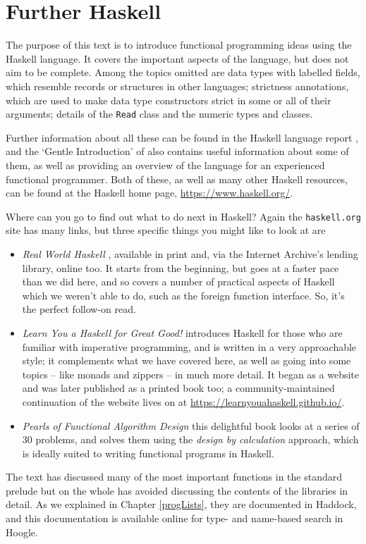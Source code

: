 \section*{Further Haskell}

The purpose of this text is to introduce functional programming ideas using the
Haskell language. It covers the important aspects of the language, but does not
aim to be complete. Among the topics omitted are data types with labelled fields, which resemble
records or structures in other languages; strictness annotations, 
which are used to make data type constructors strict in some or all of their arguments; 
details of the \texttt{Read} class and the numeric types and classes. 

Further information about all these
can be found in the Haskell language report  \cite{haskell2010}, and the
`Gentle Introduction' of \cite{gentle98} also contains useful
information about some of them, as well as providing an
overview of the language for an experienced functional programmer. Both
of these, as well as many other Haskell resources, can be found at the
Haskell home page, \url{https://www.haskell.org/}.

Where can you go to find out what to do next in Haskell? Again the \texttt{haskell.org} site has many links, but three specific things you might like to look at are 
\begin{itemize}
\item
\emph{Real World Haskell} \cite{realWorldHaskell}, available in print and, via the Internet Archive's lending library, online too. It starts from the beginning, but goes at a faster pace than we did here, and so covers a number of practical aspects of Haskell which we weren't able to do, such as the foreign function interface. So, it's the perfect follow-on read.
\item
\emph{Learn You a Haskell for Great Good!} \cite{learnYou} introduces Haskell for those who are familiar with imperative programming, and is written in a very approachable style; it complements what we have covered here, as well as going into some topics -- like monads and zippers -- in much more detail. It began as a website and was later published as a printed book too; a community-maintained continuation of the website lives on at \url{https://learnyouahaskell.github.io/}.
\item
\emph{Pearls of Functional Algorithm Design} \cite{BirdPearls} this delightful book looks at a series of 30 problems, and solves them using the \emph{design by calculation} approach, which is ideally suited to writing functional programs in Haskell.
\end{itemize}
The text has discussed many of the most important functions in the
standard prelude but on the whole has avoided discussing the contents
of the libraries in detail. As we explained in Chapter \ref{progLists}, they are documented in Haddock, and this documentation is available online for type- and name-based search in Hoogle.

